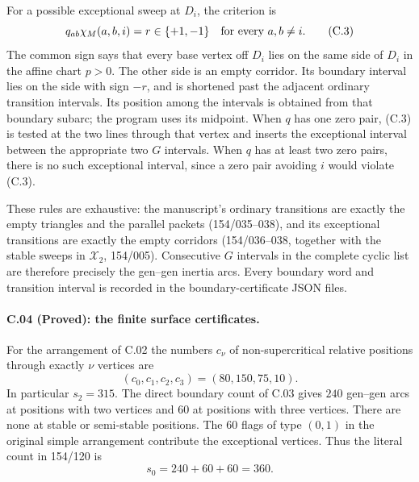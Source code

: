 For a possible exceptional sweep at $D_i$, the criterion is
\[
 q_{ab}\chi_M(a,b,i)=r\in\{+1,-1\}
 \quad\hbox{for every }a,b\ne i.              \tag{C.3}
\]
The common sign says that every base vertex off $D_i$ lies on the
same side of $D_i$ in the affine chart $p>0$. The other side is an
empty corridor. Its boundary interval lies on the side with sign
$-r$, and is shortened past the adjacent ordinary transition
intervals. Its position among the intervals is obtained from that
boundary subarc; the program uses its midpoint. When $q$ has one
zero pair, (C.3) is tested at the two lines through that vertex and
inserts the exceptional interval between the appropriate two
$G$ intervals. When $q$ has at least two zero pairs, there is no
such exceptional interval, since a zero pair avoiding $i$ would
violate (C.3).

These rules are exhaustive: the manuscript's ordinary transitions
are exactly the empty triangles and the parallel packets
(154/035--038), and its exceptional transitions are exactly the
empty corridors (154/036--038, together with the stable sweeps in
$\mathcal X_2$, 154/005). Consecutive $G$ intervals in the complete
cyclic list are therefore precisely the gen--gen inertia arcs.
Every boundary word and transition interval is recorded in the
boundary-certificate JSON files.

\paragraph{C.04 (Proved): the finite surface certificates.}
For the arrangement of C.02 the numbers $c_\nu$ of non-supercritical
relative positions through exactly $\nu$ vertices are
\[
 (c_0,c_1,c_2,c_3)=(80,150,75,10).
\]
In particular $s_2=315$. The direct boundary count of C.03 gives
$240$ gen--gen arcs at positions with two vertices and $60$ at
positions with three vertices. There are none at stable or
semi-stable positions. The $60$ flags of type $(0,1)$ in the
original simple arrangement contribute the exceptional vertices.
Thus the literal count in 154/120 is
\[
             s_0=240+60+60=360.               \tag{C.4}
\]

